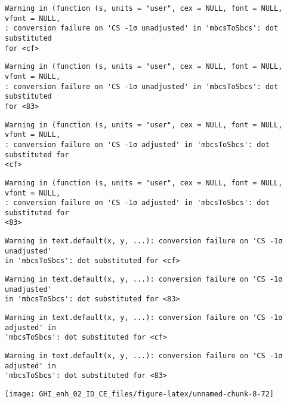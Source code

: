 \documentclass[
  10pt,
  a4paper,oneside]{article}
\begin{document}
\begin{verbatim}
Warning in (function (s, units = "user", cex = NULL, font = NULL, vfont = NULL,
: conversion failure on 'CS -1σ unadjusted' in 'mbcsToSbcs': dot substituted
for <cf>
\end{verbatim}

\begin{verbatim}
Warning in (function (s, units = "user", cex = NULL, font = NULL, vfont = NULL,
: conversion failure on 'CS -1σ unadjusted' in 'mbcsToSbcs': dot substituted
for <83>
\end{verbatim}

\begin{verbatim}
Warning in (function (s, units = "user", cex = NULL, font = NULL, vfont = NULL,
: conversion failure on 'CS -1σ adjusted' in 'mbcsToSbcs': dot substituted for
<cf>
\end{verbatim}

\begin{verbatim}
Warning in (function (s, units = "user", cex = NULL, font = NULL, vfont = NULL,
: conversion failure on 'CS -1σ adjusted' in 'mbcsToSbcs': dot substituted for
<83>
\end{verbatim}

\begin{verbatim}
Warning in text.default(x, y, ...): conversion failure on 'CS -1σ unadjusted'
in 'mbcsToSbcs': dot substituted for <cf>
\end{verbatim}

\begin{verbatim}
Warning in text.default(x, y, ...): conversion failure on 'CS -1σ unadjusted'
in 'mbcsToSbcs': dot substituted for <83>
\end{verbatim}

\begin{verbatim}
Warning in text.default(x, y, ...): conversion failure on 'CS -1σ adjusted' in
'mbcsToSbcs': dot substituted for <cf>
\end{verbatim}

\begin{verbatim}
Warning in text.default(x, y, ...): conversion failure on 'CS -1σ adjusted' in
'mbcsToSbcs': dot substituted for <83>
\end{verbatim}

\begin{center}\texttt{[image: GHI\_enh\_02\_ID\_CE\_files/figure-latex/unnamed-chunk-8-72]} \end{center}
\end{document}
